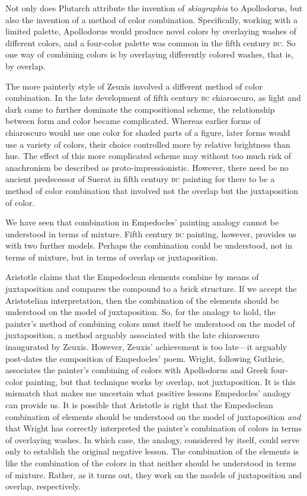 Not only does Plutarch attribute the invention of \emph{skiagraphia} to Apollodorus, but also the invention of a method of color combination. Specifically, working with a limited palette, Apollodorus would produce novel colors by overlaying washes of different colors, and a four-color palette was common in the fifth century \textsc{bc}. So one way of combining colors is by overlaying differently colored washes, that is, by overlap.

The more painterly style of Zeuxis involved a different method of color combination. In the late development of fifth century \textsc{bc} chiaroscuro, as light and dark came to further dominate the compositional scheme, the relationship between form and color became complicated. Whereas earlier forms of chiaroscuro would use one color for shaded parts of a figure, later forms would use a variety of colors, their choice controlled more by relative brightness than hue. The effect of this more complicated scheme may without too much risk of anachronism be described as proto-impressionistic. However, there need be no ancient predecessor of Suerat in fifth century \textsc{bc} painting for there to be a method of color combination that involved not the overlap but the juxtaposition of color.

We have seen that combination in Empedocles' painting analogy cannot be understood in terms of mixture. Fifth century \textsc{bc} painting, however, provides us with two further models. Perhaps the combination could be understood, not in terms of mixture, but in terms of overlap or juxtaposition. 

Aristotle claims that the Empedoclean elements combine by means of juxtaposition and compares the compound to a brick structure. If we accept the Aristotelian interpretation, then the combination of the elements should be understood on the model of juxtaposition. So, for the analogy to hold, the painter's method of combining colors must itself be understood on the model of juxtaposition, a method arguably associated with the late chiaroscuro inaugurated by Zeuxis. However, Zeuxis' achievement is too late---it arguably post-dates the composition of Empedocles' poem. Wright, following Guthrie, associates the painter's combining of colors with Apollodorus and Greek four-color painting, but that technique works by overlap, not juxtaposition. It is this mismatch that makes me uncertain what positive lessons Empedocles' analogy can provide us. It is possible that Aristotle is right that the Empedoclean combination of elements should be understood on the model of juxtaposition \emph{and} that Wright has correctly interpreted the painter's combination of colors in terms of overlaying washes. In which case, the analogy, considered by itself, could serve only to establish the original negative lesson. The combination of the elements is like the combination of the colors in that neither should be understood in terms of mixture. Rather, as it turns out, they work on the models of juxtaposition and overlap, respectively.

